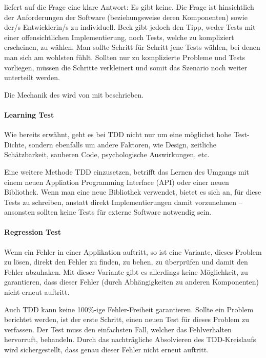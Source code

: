 \cite[134]{Beck:2003} liefert auf die Frage  eine klare Antwort: Es gibt keine.
Die Frage ist hinsichtlich der Anforderungen der Software (beziehungsweise deren Komponenten) sowie der/s Entwicklerin/s zu individuell.
Beck gibt jedoch den Tipp, weder Tests mit einer offensichtlichen Implementierung, noch Tests, welche zu kompliziert erscheinen, zu wählen. Man sollte Schritt für Schritt jene Tests wählen, bei denen man sich am wohlsten fühlt. Sollten nur zu komplizierte Probleme und Tests vorliegen, müssen die Schritte verkleinert und somit das Szenario noch weiter unterteilt werden.

Die Mechanik des  wird von \cite[134]{Beck:2003} mit  beschrieben.

\paragraph{Learning Test}

Wie bereits erwähnt, geht es bei TDD nicht nur um eine möglichst hohe Test-Dichte, sondern ebenfalls um andere Faktoren, wie Design, zeitliche Schätzbarkeit, sauberen Code, psychologische Auswirkungen, etc.

Eine weitere Methode TDD einzusetzen, betrifft das Lernen des Umgangs mit einem neuen Appliation Programming Interface (API) oder einer neuen Bibliothek. Wenn man eine neue Bibliothek verwendet, bietet es sich an, für diese Tests zu schreiben, anstatt direkt Implementierungen damit vorzunehmen -- ansonsten sollten keine Tests für externe Software notwendig sein.

\paragraph{Regression Test}
Wenn ein Fehler in einer Applikation auftritt, so ist eine Variante, dieses Problem zu lösen, direkt den Fehler zu finden, zu behen, zu überprüfen und damit den Fehler abzuhaken. Mit dieser Variante gibt es allerdings keine Möglichkeit, zu garantieren, dass dieser Fehler (durch Abhängigkeiten zu anderen Komponenten) nicht erneut auftritt.

Auch TDD kann keine 100\%-ige Fehler-Freiheit garantieren. Sollte ein Problem berichtet werden, ist der erste Schritt, einen neuen Test für dieses Problem zu verfassen. Der Test muss den einfachsten Fall, welcher das Fehlverhalten hervorruft, behandeln. Durch das nachträgliche Absolvieren des TDD-Kreislaufs wird sichergestellt, dass genau dieser Fehler nicht erneut auftritt.

